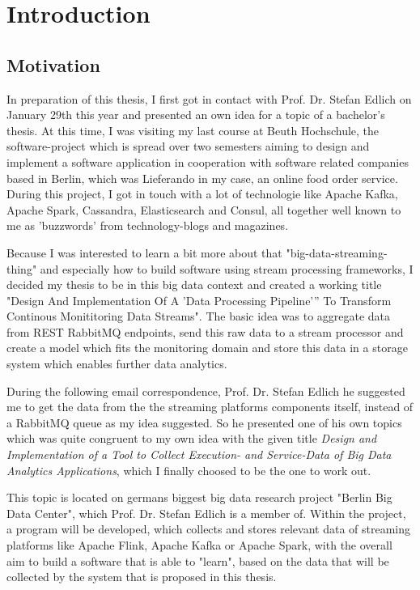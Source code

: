 \chapter{Introduction}

\section{Motivation}

In preparation of this thesis, I first got in contact with Prof. Dr. Stefan Edlich on January 29th
this year and presented an own idea for a topic of a bachelor's thesis. At this time, I was
visiting my last course at Beuth Hochschule, the software-project which is spread over two semesters
aiming to design and implement a software application in cooperation with software related companies
based in Berlin, which was Lieferando in my case, an online food order service. During this project,
I got in touch with a lot of technologie like Apache Kafka, Apache Spark, Cassandra, Elasticsearch
and Consul, all together well known to me as 'buzzwords' from technology-blogs and magazines.

Because I was interested to learn a bit more about that "big-data-streaming-thing" and especially how
to build software using stream processing frameworks, I decided my thesis to be in this big data context
and created a working title "Design And Implementation Of A 'Data Processing Pipeline'” To Transform
Continous Monititoring Data Streams". The basic idea was to aggregate data from REST RabbitMQ endpoints,
send this raw data to a stream processor and create a model which fits the monitoring domain and store
this data in a storage system which enables further data analytics.

During the following email correspondence, Prof. Dr. Stefan Edlich he suggested me to get the data
from the the streaming platforms components itself, instead of a RabbitMQ queue as my idea suggested.
So he presented one of his own topics which was quite congruent to my own idea with the given title
\textit{Design and Implementation of a Tool to Collect Execution- and Service-Data of Big Data Analytics
Applications}, which I finally choosed to be the one to work out.

This topic is located on germans biggest big data research project "Berlin Big Data Center", which
Prof. Dr. Stefan Edlich is a member of. Within the project, a program will be developed, which collects
and stores relevant data of streaming platforms like Apache Flink, Apache Kafka or Apache Spark,
with the overall aim to build a software that is able to "learn", based on the data that
will be collected by the system that is proposed in this thesis.

